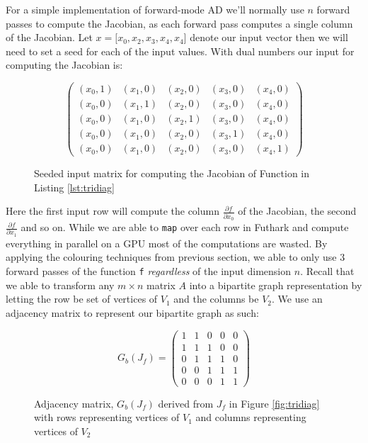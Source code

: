 	For a simple implementation of forward-mode AD we'll normally use
	$n$ forward passes to compute the Jacobian, as each forward pass computes a 
	single column of the Jacobian. 	 Let $x = \lbrack x_0, x_2, x_3, x_4, x_4 \rbrack$ denote our input vector then
	we will need to set a seed for each of the input values. With dual numbers our input for computing the Jacobian is:
		\begin{figure}[H]
		$$ \left(\begin{matrix}
(x_0, 1) & (x_1, 0) & (x_2, 0) & (x_3, 0) & (x_4, 0) \\
(x_0, 0) & (x_1, 1) & (x_2, 0) & (x_3, 0) & (x_4, 0) \\
(x_0, 0) & (x_1, 0) & (x_2, 1) & (x_3, 0) & (x_4, 0) \\
(x_0, 0) & (x_1, 0) & (x_2, 0) & (x_3, 1) & (x_4, 0) \\
(x_0, 0) & (x_1, 0) & (x_2, 0) & (x_3, 0) & (x_4, 1)
		\end{matrix}\right) $$
		\caption{Seeded input matrix for computing the Jacobian of Function in Listing \ref{lst:tridiag}}
	\end{figure}	
    Here the first input row will compute the column $\frac{\partial f}{\partial x_0}$ of the Jacobian, 
    the second $\frac{\partial f}{\partial x_1}$ and so on. 
	While we are able to \texttt{map} over each row in Futhark and compute everything in parallel on a GPU 
	most of the computations are wasted.
	By applying the colouring techniques from previous section, we able to only use
	$3$ forward passes
	of the function \texttt{f} \emph{regardless} of the input dimension $n$.  
	Recall that we able to transform any $m\times n$ matrix $A$ into a bipartite
	graph 
	representation by letting the row be set of vertices of $V_1$ and the columns be
	$V_2$. 
	We use an adjacency matrix to represent our bipartite graph as such:
	\begin{figure}[H]
		$$ G_b(J_f) = \left(\begin{matrix}
		1 & 1 & 0 & 0 & 0 \\
		1 & 1 & 1 & 0 & 0\\
		0 & 1 & 1 & 1 & 0\\
		0 & 0 & 1 & 1 & 1 \\
		0 & 0 & 0 & 1 & 1
		\end{matrix}\right) $$
		\caption{Adjacency matrix, $G_b(J_f)$ derived from \texttt{$J_f$} in Figure
			\ref{fig:tridiag} with rows representing vertices of $V_1$ and columns
			representing vertices of $V_2$}
	\end{figure}
